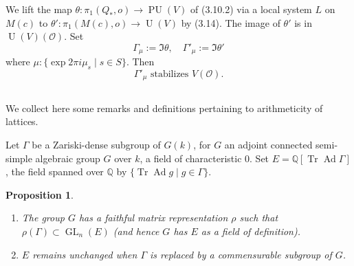 \documentclass[12pt,a4paper]{article}
\theoremstyle{plain}
\newtheorem{proposition}[theorem]{Proposition}
\theoremstyle{definition}
\theoremstyle{remark}
\DeclareMathOperator{\Tr}{Tr}
\DeclareMathOperator{\Ad}{Ad}
\DeclareMathOperator{\PU}{PU}
\DeclareMathOperator{\U}{U}
\DeclareMathOperator{\GL}{GL}
\begin{document}
We lift the map $\theta : \pi_1(Q_*, o) \to \PU(V)$ of (3.10.2) via a local system $L$ on $M(c)$ to $\theta' : \pi_1(M(c), o) \to \U(V)$ by (3.14). The image of $\theta'$ is in $\U(V)(\mathcal{O})$. Set
\begin{equation}
\label{12.1.2}
\Gamma_\mu := \Im \theta, \quad \Gamma'_\mu := \Im \theta'
\end{equation}
where $\mu : \{\exp 2\pi i \mu_s \mid s \in S\}$. Then
\begin{equation}
\label{12.1.3}
\Gamma'_\mu \text{ stabilizes } V(\mathcal{O}).
\end{equation}

\subsection{}
\label{12.2}

We collect here some remarks and definitions pertaining to arithmeticity of lattices.

Let $\Gamma$ be a Zariski-dense subgroup of $G(k)$, for $G$ an adjoint connected semi-simple algebraic group $G$ over $k$, a field of characteristic $0$. Set $E = \mathbb{Q}[\Tr \Ad \Gamma]$, the field spanned over $\mathbb{Q}$ by $\{\Tr \Ad g \mid g \in \Gamma\}$.

\begin{proposition}
\label{12.2.1}
\quad
\begin{enumerate}
\item[(i)] The group $G$ has a faithful matrix representation $\rho$ such that $\rho(\Gamma) \subset \GL_n(E)$ (and hence $G$ has $E$ as a field of definition).
\item[(ii)] $E$ remains unchanged when $\Gamma$ is replaced by a commensurable subgroup of $G$.
\end{enumerate}
\end{proposition}
\end{document}
